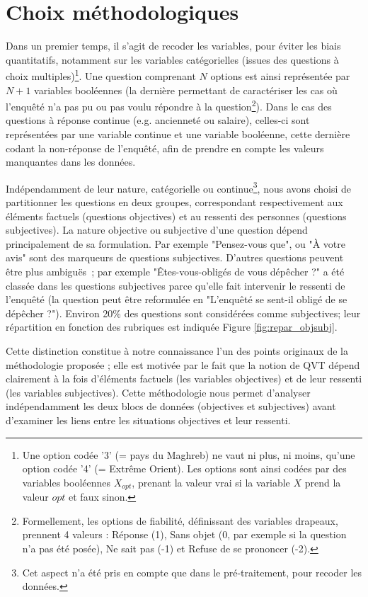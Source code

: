 \documentclass[11pt,fleqn,openany,frenchb]{book} %
\begin{document}
\section{Choix méthodologiques}
	Dans un premier temps, il s'agit de recoder les variables, pour éviter les biais quantitatifs, notamment sur les variables catégorielles (issues des questions à choix multiples)\footnote{Une option codée '3' (= pays du Maghreb) ne vaut ni plus, ni moins, qu'une option codée '4' (= Extrême Orient). Les options sont ainsi codées par des variables booléennes $X_{opt}$, prenant la valeur vrai
si la variable $X$ prend la valeur $opt$ et faux sinon.}. Une question comprenant $N$ options est ainsi représentée par $N+1$ variables booléennes (la dernière permettant de caractériser les cas où l'enquêté n'a pas pu ou pas voulu répondre à la question\footnote{Formellement, les options de fiabilité, définissant des variables drapeaux, prennent 4 valeurs : Réponse (1), Sans objet (0, par exemple si la question n'a pas été posée), Ne sait pas (-1) et Refuse de se prononcer (-2). }).
Dans le cas des questions à réponse continue (e.g. ancienneté ou salaire), celles-ci sont représentées par une variable continue et une variable booléenne, cette dernière codant la non-réponse de l'enquêté, afin de prendre en compte les valeurs manquantes dans les données.\par

Indépendamment de leur nature, catégorielle ou continue\footnote{Cet aspect n'a été pris en compte que dans le pré-traitement, pour recoder les données.}, nous avons choisi de partitionner les questions en deux groupes, correspondant respectivement aux éléments factuels (questions objectives) et au ressenti des personnes (questions subjectives). La nature objective ou subjective d'une question dépend principalement de sa formulation. Par  exemple "Pensez-vous que", ou "\`A votre avis" sont des marqueurs de questions subjectives.   D'autres questions peuvent être plus ambiguës~; par exemple "Êtes-vous-obligés de vous dépêcher ?" a été classée dans les questions subjectives parce qu'elle fait intervenir le ressenti de l'enquêté (la question peut être reformulée en "L'enquêté se sent-il obligé de se dépêcher ?"). Environ 20\% des questions sont considérées comme subjectives; leur répartition en fonction des rubriques 
est indiquée Figure \ref{fig:repar_objsubj}. \par

Cette distinction constitue à notre connaissance l'un des points originaux de la méthodologie proposée ; elle est motivée par le fait que la notion de QVT dépend clairement à la fois d'éléments factuels (les variables objectives) et de leur ressenti (les variables subjectives).  
Cette méthodologie nous permet d'analyser indépendamment les deux blocs de données (objectives et subjectives) avant d'examiner les liens entre les situations objectives et leur ressenti. \par
\end{document}
